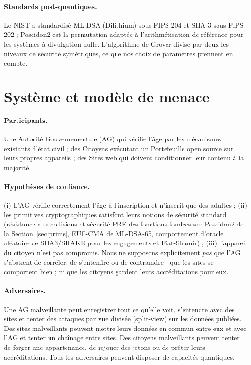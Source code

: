 \documentclass[11pt]{article}
\theoremstyle{definition}
\begin{document}
\paragraph{Standards post-quantiques.} Le NIST a standardisé ML-DSA (Dilithium) sous FIPS
204 \cite{fips204,dilithium} et SHA-3 sous FIPS 202 \cite{fips202} ; Poseidon2
\cite{poseidon2} est la permutation adaptée à l'arithmétisation de référence pour les
systèmes à divulgation nulle. L'algorithme de Grover \cite{grover} divise par deux les
niveaux de sécurité symétriques, ce que nos choix de paramètres prennent en compte.

\section{Système et modèle de menace}
\label{sec:model}

\paragraph{Participants.} Une Autorité Gouvernementale (AG) qui vérifie l'âge par les
mécanismes existants d'état civil ; des Citoyens exécutant un Portefeuille open source sur
leurs propres appareils ; des Sites web qui doivent conditionner leur contenu à la
majorité.

\paragraph{Hypothèses de confiance.} (i) L'AG vérifie correctement l'âge à l'inscription
et n'inscrit que des adultes ; (ii) les primitives cryptographiques satisfont leurs
notions de sécurité standard (résistance aux collisions et sécurité PRF des fonctions
fondées sur Poseidon2 de la Section~\ref{sec:prims}, EUF-CMA de ML-DSA-65, comportement
d'oracle aléatoire de SHA3/SHAKE \cite{bellrog} pour les engagements et Fiat-Shamir) ;
(iii) l'appareil du citoyen n'est pas compromis. Nous ne supposons explicitement
\emph{pas} que l'AG s'abstient de corréler, de s'entendre ou de contraindre ; que les
sites se comportent bien ; ni que les citoyens gardent leurs accréditations pour eux.

\paragraph{Adversaires.} Une AG malveillante peut enregistrer tout ce qu'elle voit,
s'entendre avec des sites et tenter des attaques par vue divisée (split-view) sur les
données publiées. Des sites malveillants peuvent mettre leurs données en commun entre eux
et avec l'AG et tenter un chaînage entre sites. Des citoyens malveillants peuvent tenter
de forger une appartenance, de rejouer des jetons ou de prêter leurs accréditations. Tous
les adversaires peuvent disposer de capacités quantiques.
\end{document}
